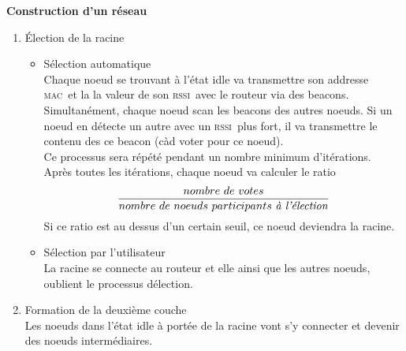\documentclass[a4paper, 12pt]{report}
\newcommand{\mac}{\textsc{mac}}
\newcommand{\rssi}{\textsc{rssi}}
\begin{document}
        \textbf{Construction d'un réseau}
        \newline
        \begin{enumerate}
            \item \'Election de la racine
                \begin{itemize}
                    \item Sélection automatique\\
                        Chaque noeud se trouvant à l'état idle va transmettre son addresse \mac\ et la
                        la valeur de son \rssi\ avec le routeur via des beacons.\\
                        Simultanément, chaque noeud scan les beacons des autres noeuds. Si un noeud
                        en détecte un autre avec un \rssi\ plus fort, il va transmettre le contenu des
                        ce beacon (càd voter pour ce noeud).\\
                        Ce processus sera répété pendant un nombre minimum d'itérations.\\
                        Après toutes les itérations, chaque noeud va calculer le ratio
                        \[\frac{nombre\ de\ votes}{nombre\ de\ noeuds\ participants\ \textrm{\textit{à l'élection}}}\]
                        Si ce ratio est au dessus d'un certain seuil, ce noeud deviendra la racine.

                    \item Sélection par l'utilisateur\\
                        La racine se connecte au routeur et elle ainsi que les autres noeuds, oublient le processus
                        délection.
                \end{itemize}
            \item Formation de la deuxième couche\\
                Les noeuds dans l'état idle à portée de la racine vont s'y connecter et devenir des noeuds intermédiaires.
            

\end{enumerate}
\end{document}
